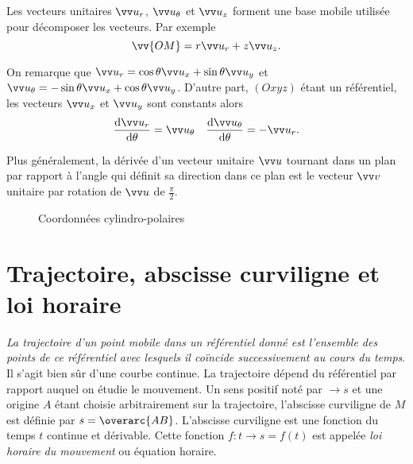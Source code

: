 Les vecteurs unitaires \(\ur\), \(\utheta\) et \(\uz\) forment une base mobile 
utilisée pour décomposer les vecteurs. Par exemple
\begin{equation}%
  \vv{OM}=r \ur + z\uz.%
\end{equation}%

On remarque que \(\ur = \cos \theta \ux + \sin \theta \uy\) et \(\utheta = 
-\sin \theta \ux + \cos \theta \uy\). D'autre part, \((Oxyz)\) étant un 
référentiel, les vecteurs \(\ux\) et \(\uy\) sont constants alors
\begin{equation}%
  \derived{\ur}{\theta} = \utheta \quad \derived{\utheta}{\theta} = -\ur.%
\end{equation}%

Plus généralement, la dérivée d'un vecteur unitaire \(\vu\) tournant dans un 
plan par rapport à l'angle qui définit sa direction dans ce plan est le vecteur 
\(\vvv\) unitaire par rotation de \(\vu\) de \(\frac{\pi}{2}\).

 \begin{figure}%
   \centering
   \caption{Coordonnées cylindro-polaires}\label{fig:coordonnees}%
 \end{figure}%

\section{Trajectoire, abscisse curviligne et loi horaire}%
\label{chap1-sec:trajectoireabcissecurv}%

\emph{La trajectoire d'un point mobile dans un référentiel donné est l'ensemble 
des points de ce référentiel avec lesquels il coïncide successivement au cours 
du temps}. Il s'agit bien sûr d'une courbe continue. La trajectoire dépend du 
référentiel par rapport auquel on étudie le mouvement. Un sens positif noté par 
\(\rightarrow s\) et une origine \(A\) étant choisie arbitrairement sur la 
trajectoire, l'abscisse curviligne de \(M\) est définie par \(s=\overarc{AB}\). 
L'abscisse curviligne est une fonction du temps \(t\) continue et dérivable. 
Cette fonction \(f:t \rightarrow s=f(t)\) est appelée \emph{loi horaire du 
mouvement} ou équation horaire.

